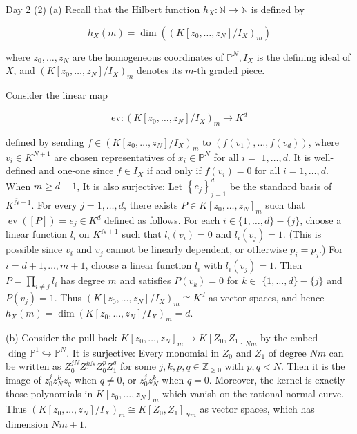 \documentclass[10pt]{article}
\begin{document}
Day 2 (2) (a) Recall that the Hilbert function $h_{X}: \mathbb{N} \rightarrow \mathbb{N}$ is defined by

$$
h_{X}(m)=\operatorname{dim}\left(\left(K\left[z_{0}, \ldots, z_{N}\right] / I_{X}\right)_{m}\right)
$$

where $z_{0}, \ldots, z_{N}$ are the homogeneous coordinates of $\mathbb{P}^{N}, I_{X}$ is the defining ideal of $X$, and $\left(K\left[z_{0}, \ldots, z_{N}\right] / I_{X}\right)_{m}$ denotes its $m$-th graded piece.

Consider the linear map

$$
\mathrm{ev}:\left(K\left[z_{0}, \ldots, z_{N}\right] / I_{X}\right)_{m} \rightarrow K^{d}
$$

defined by sending $f \in\left(K\left[z_{0}, \ldots, z_{N}\right] / I_{X}\right)_{m}$ to $\left(f\left(v_{1}\right), \ldots, f\left(v_{d}\right)\right)$, where $v_{i} \in K^{N+1}$ are chosen representatives of $x_{i} \in \mathbb{P}^{N}$ for all $i=$ $1, \ldots, d$. It is well-defined and one-one since $f \in I_{X}$ if and only if $f\left(v_{i}\right)=0$ for all $i=1, \ldots, d$. When $m \geq d-1$, It is also surjective: Let $\left\{e_{j}\right\}_{j=1}^{d}$ be the standard basis of $K^{\bar{N}+1}$. For every $j=1, \ldots, d$, there exists $P \in K\left[z_{0}, \ldots, z_{N}\right]_{m}$ such that $\operatorname{ev}([P])=e_{j} \in K^{d}$ defined
as follows. For each $i \in\{1, \ldots, d\}-\{j\}$, choose a linear function $l_{i}$ on $K^{N+1}$ such that $l_{i}\left(v_{i}\right)=0$ and $l_{i}\left(v_{j}\right)=1$. (This is possible since $v_{i}$ and $v_{j}$ cannot be linearly dependent, or otherwise $p_{i}=p_{j}$.) For $i=d+1, \ldots, m+1$, choose a linear function $l_{i}$ with $l_{i}\left(v_{j}\right)=1$. Then $P=\prod_{i \neq j} l_{i}$ has degree $m$ and satisfies $P\left(v_{k}\right)=0$ for $k \in$ $\{1, \ldots, d\}-\{j\}$ and $P\left(v_{j}\right)=1$. Thus $\left(K\left[z_{0}, \ldots, z_{N}\right] / I_{X}\right)_{m} \cong K^{d}$ as vector spaces, and hence $h_{X}(m)=\operatorname{dim}\left(K\left[z_{0}, \ldots, z_{N}\right] / I_{X}\right)_{m}=d$.

(b) Consider the pull-back $K\left[z_{0}, \ldots, z_{N}\right]_{m} \rightarrow K\left[Z_{0}, Z_{1}\right]_{N m}$ by the embed$\operatorname{ding} \mathbb{P}^{1} \hookrightarrow \mathbb{P}^{N}$. It is surjective: Every monomial in $Z_{0}$ and $Z_{1}$ of degree $N m$ can be written as $Z_{0}^{j N} Z_{1}^{k N} Z_{0}^{p} Z_{1}^{q}$ for some $j, k, p, q \in \mathbb{Z}_{\geq 0}$ with $p, q<N$. Then it is the image of $z_{0}^{j} z_{N}^{k} z_{q}$ when $q \neq 0$, or $z_{0}^{j} z_{N}^{k}$ when $q=0$. Moreover, the kernel is exactly those polynomials in $K\left[z_{0}, \ldots, z_{N}\right]_{m}$ which vanish on the rational normal curve. Thus $\left(K\left[z_{0}, \ldots, z_{N}\right] / I_{X}\right)_{m} \cong K\left[Z_{0}, Z_{1}\right]_{N m}$ as vector spaces, which has dimension $N m+1$.
\end{document}
